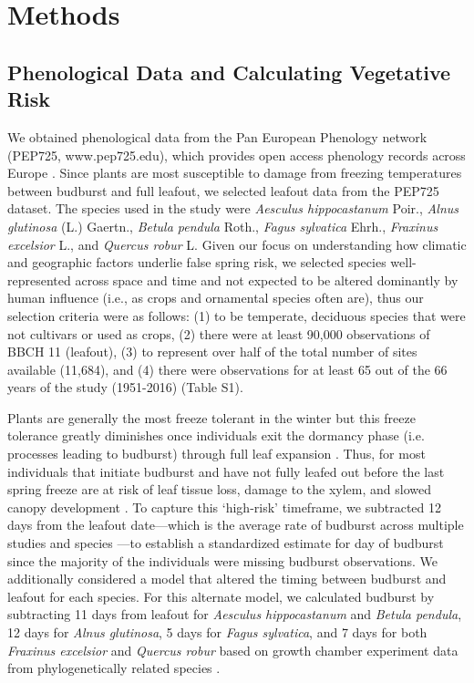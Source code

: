 \documentclass{article}\usepackage[]{graphicx}\usepackage[]{color}
\begin{document}
\section*{Methods} 
\subsection*{Phenological Data and Calculating Vegetative Risk}
We obtained phenological data from the Pan European Phenology network (PEP725, www.pep725.edu), which provides open access phenology records across Europe \citep{Templ2018}. Since plants are most susceptible to damage from freezing temperatures between budburst and full leafout, we selected leafout data \citep[i.e., in][BBCH 11, which is defined as the point of leaf unfolding and the first visible leaf stalk]{Meier2001} from the PEP725 dataset. The species used in the study were \textit{Aesculus hippocastanum} Poir., \textit{Alnus glutinosa} (L.) Gaertn., \textit{Betula pendula} Roth., \textit{Fagus sylvatica} Ehrh., \textit{Fraxinus excelsior} L., and \textit{Quercus robur} L. Given our focus on understanding how climatic and geographic factors underlie false spring risk, we selected species well-represented across space and time and not expected to be altered dominantly by human influence (i.e., as crops and ornamental species often are), thus our selection criteria were as follows: (1) to be temperate, deciduous species that were not cultivars or used as crops, (2) there were at least 90,000 observations of BBCH 11 (leafout), (3) to represent over half of the total number of sites available (11,684), and (4) there were observations for at least 65 out of the 66 years of the study (1951-2016) (Table S1). 

Plants are generally the most freeze tolerant in the winter but this freeze tolerance greatly diminishes once individuals exit the dormancy phase (i.e. processes leading to budburst) through full leaf expansion \citep{Lenz2016, Vitasse2014}. Thus, for most individuals that initiate budburst and have not fully leafed out before the last spring freeze are at risk of leaf tissue loss, damage to the xylem, and slowed canopy development \citep{Gu2008, Hufkens2012}. To capture this `high-risk' timeframe, we subtracted 12 days from the leafout date---which is the average rate of budburst across multiple studies and species \citep{Donnelly2017, Flynn2018, NPN2019}---to establish a standardized estimate for day of budburst since the majority of the individuals were missing budburst observations. 
We additionally considered a model that altered the timing between budburst and leafout for each species. For this alternate model, we calculated budburst by subtracting 11 days from leafout for \textit{Aesculus hippocastanum} and \textit{Betula pendula}, 12 days for \textit{Alnus glutinosa}, 5 days for \textit{Fagus sylvatica}, and 7 days for both \textit{Fraxinus excelsior} and \textit{Quercus robur} based on growth chamber experiment data from phylogenetically related species \citep{Buerki2010, Wang2016, Hipp2017, Flynn2018}.
\end{document}
